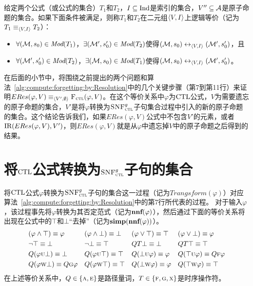 \begin{definition}
	给定两个公式（或公式的集合）$T_1$和$T_2$，$I\subseteq \textrm{Ind}$是索引的集合，$V''\subseteq {\cal A}$是原子命题的集合。如果下面条件被满足，则称$T_1$和$T_2$在二元组${\langle{V,I}\rangle}$上逻辑等价（记为$T_1\equiv_{{\langle{V,I}\rangle}} T_2$）：
	\begin{itemize}
		\item $\forall ({\cal M},s_0)\in \textit{Mod}(T_1)$，$\exists ({\cal M}',s_0')\in \textit{Mod}(T_2)$使得$({\cal M},s_0) \leftrightarrow_{{\langle{V, I}\rangle}} ({\cal M}',s_0')$，且
		\item $\forall ({\cal M}',s_0')\in \textit{Mod}(T_2)$，$\exists ({\cal M},s_0)\in \textit{Mod}(T_1)$使得$({\cal M},s_0) \leftrightarrow_{{\langle{V, I}\rangle}} ({\cal M}',s_0')$。
	\end{itemize}
	
\end{definition}

在后面的小节中，将围绕之前提出的两个问题和算法~\ref{alg:compute:forgetting:by:Resolution}中的几个关键步骤（第7到第11行）来证明$ERes(\varphi, V) \equiv_{{\langle{V',\emptyset}\rangle}} {\textsc{F}_{\textsc{ctl}}}(\varphi, V)$。在这个等价关系中$\varphi$为$\textrm{CTL}$公式，$V$为需要遗忘的原子命题的集合，$V'$是将$\varphi$转换为${\textsc{SNF}_{\textsc{ctl}}^g}$子句集合过程中引入的新的原子命题的集合。这个结论告诉我们，如果$ERes(\varphi, V)$公式中不包含$V'$的元素，或者$\textrm{IR}(ERes(\varphi, V), V')$，则$ERes(\varphi, V)$就是从$\varphi$中遗忘掉$V$中的原子命题之后得到的结果。

\section{将$\textrm{CTL}$公式转换为${\textsc{SNF}_{\textsc{ctl}}^g}$子句的集合}
将$\textrm{CTL}$公式$\varphi$转换为${\textsc{SNF}_{\textsc{ctl}}^g}$子句的集合这一过程（记为$Trangsform(\varphi)$）对应算法~\ref{alg:compute:forgetting:by:Resolution}中的第7行所代表的过程。
对于输入$\varphi$，该过程事先将$\varphi$转换为其否定范式（记为$\textbf{nnf}(\varphi)$），然后通过下面的等价关系\cite{zhang2014resolution,DBLP:books/el/leeuwen90/Emerson90}将出现在公式中的$\top$和$\bot$“去掉”（记为$\textbf{simp}(\textbf{nnf}(\varphi))$）。
\begin{align*}
	& (\varphi \wedge \top) \equiv \varphi && (\varphi \wedge \bot) \equiv \bot && (\varphi \vee \top)\equiv \top && (\varphi \vee \bot) \equiv \varphi \\
	& \neg \top \equiv \bot && \neg \bot \equiv \top && QT \bot \equiv \bot && QT \top \equiv \top  \\
	& Q(\varphi \textsc{u} \bot) \equiv \bot  && Q(\varphi \textsc{u} \top) \equiv \top && Q(\bot \textsc{u} \varphi) \equiv \varphi && Q(\top \textsc{u} \varphi) \equiv Q\textsc{f} \varphi\\
	& Q(\varphi \textsc{w} \bot) \equiv Q \textsc{g} \varphi  && Q(\varphi \textsc{w} \top) \equiv \top && Q(\bot \textsc{w} \varphi) \equiv \varphi && Q(\top \textsc{w} \varphi) \equiv \top
\end{align*}
在上述等价关系中，$Q\in \{\textsc{a},\textsc{e}\}$是路径量词，$T\in \{\textsc{f}, \textsc{g}, \textsc{x}\}$是时序操作符。

